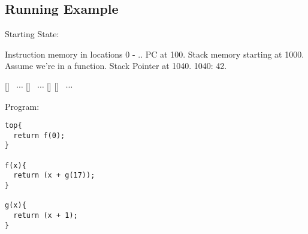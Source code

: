 \documentclass[acmsmall,review,anonymous]{acmart}\settopmatter{printfolios=true,printccs=false,printacmref=false}
\begin{document}
\subsection{Running Example}


\newcommand*{\add}{\text{add}}
\newcommand*{\addi}{\text{addi}}
\newcommand*{\sw}{\text{sw}}
\newcommand*{\lw}{\text{lw}}
\newcommand*{\jal}{\text{jal}}
\newcommand*{\jalr}{\text{jalr}}
%
%
%

Starting State:

Instruction memory in locations 0 - ..
PC at 100.
Stack memory starting at 1000.
Assume we're in a function.
Stack Pointer at 1040.
1040: 42.

\begin{center}
\MemoryLabel{35.2em}{1.8em}{$\downarrow$}
[{}]%
~$\cdots$
[{}]%
~$\cdots$
[{}]%
[{}]
~$\cdots$
\\
\end{center}


Program:

\begin{verbatim}
top{
  return f(0);
}

f(x){
  return (x + g(17));
}

g(x){
  return (x + 1);
}
\end{verbatim}
\end{document}

